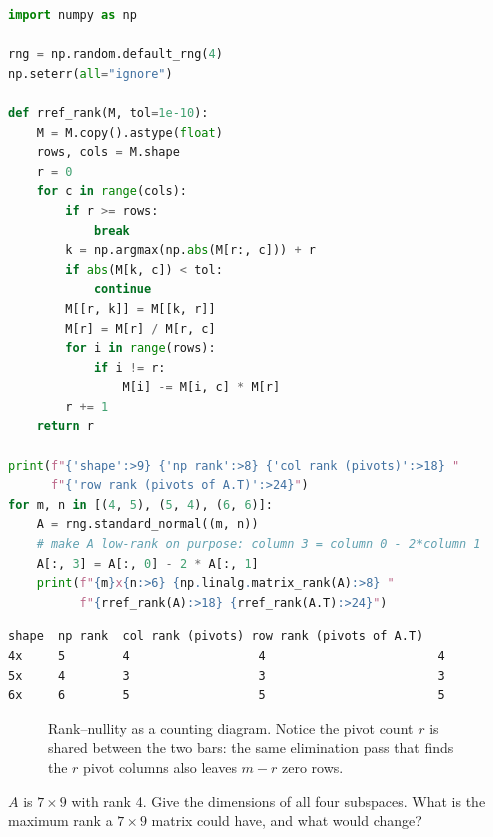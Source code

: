 \begin{lstlisting}[language=Python,caption={Rank computed three ways on matrices we force to be low-rank: pivots of $A$ (column rank), pivots of $A^{T}$ (row rank), and \texttt{np.linalg.matrix\_rank}. File: \texttt{code/ch03\_rank\_two\_ways.py}.},label={lst:rank}]
import numpy as np

rng = np.random.default_rng(4)
np.seterr(all="ignore")

def rref_rank(M, tol=1e-10):
    M = M.copy().astype(float)
    rows, cols = M.shape
    r = 0
    for c in range(cols):
        if r >= rows:
            break
        k = np.argmax(np.abs(M[r:, c])) + r
        if abs(M[k, c]) < tol:
            continue
        M[[r, k]] = M[[k, r]]
        M[r] = M[r] / M[r, c]
        for i in range(rows):
            if i != r:
                M[i] -= M[i, c] * M[r]
        r += 1
    return r

print(f"{'shape':>9} {'np rank':>8} {'col rank (pivots)':>18} "
      f"{'row rank (pivots of A.T)':>24}")
for m, n in [(4, 5), (5, 4), (6, 6)]:
    A = rng.standard_normal((m, n))
    # make A low-rank on purpose: column 3 = column 0 - 2*column 1
    A[:, 3] = A[:, 0] - 2 * A[:, 1]
    print(f"{m}x{n:>6} {np.linalg.matrix_rank(A):>8} "
          f"{rref_rank(A):>18} {rref_rank(A.T):>24}")
\end{lstlisting}

\begin{lstlisting}[caption={Output of listing~\ref{lst:rank}. Column rank and row rank agree on every shape — and equal the SVD-based library rank. (The tall $5\times4$ case loses one to our forced dependency, the wide $4\times5$ case is already row-limited.)}]
    shape  np rank  col rank (pivots) row rank (pivots of A.T)
4x     5        4                  4                        4
5x     4        3                  3                        3
6x     6        5                  5                        5
\end{lstlisting}

\begin{figure}[htbp]
\centering

\caption{Rank--nullity as a counting diagram. Notice the pivot count $r$ is shared between the two bars: the same elimination pass that finds the $r$ pivot columns also leaves $m-r$ zero rows.}
\label{fig:ranknull}
\end{figure}

\begin{exercise}[medium]
$A$ is $7\times9$ with rank 4. Give the dimensions of all four subspaces. What is the maximum rank a $7\times9$ matrix could have, and what would change?
\end{exercise}


